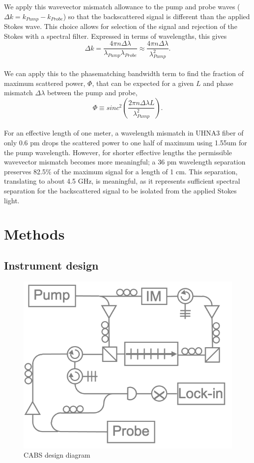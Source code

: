\documentclass[%
  reprint,
  superscriptaddress,
  amsmath,amssymb,
  aps,
  prapplied,
]{revtex4-2}
\begin{document}
We apply this wavevector mismatch allowance to the pump and probe waves ($\Delta k = k_{Pump} - k_{Probe}$) so that the backscattered signal is different than the applied Stokes wave. This choice allows for selection of the signal and rejection of the Stokes with a spectral filter. Expressed in terms of wavelengths, this gives
\\
\begin{equation}
  \Delta k = \frac{4\pi n\Delta\lambda}{\lambda_{Pump}\lambda_{Probe}} \approx \frac{4\pi n\Delta\lambda}{\lambda_{Pump}^{2}}.
\end{equation}
\\
We can apply this to the phasematching bandwidth term to find the fraction of maximum scattered power, $\Phi$, that can be expected for a given $L$ and phase mismatch $\Delta\lambda$ between the pump and probe,
\\
\begin{equation}
  \Phi \equiv sinc^{2}\left(\frac{2\pi n\Delta\lambda L}{\lambda_{Pump}^{2}}\right).
\end{equation}
\\

For an effective length of one meter, a wavelength mismatch in UHNA3 fiber of only 0.6 pm drops the scattered power to one half of maximum using 1.55um for the pump wavelength. However, for shorter effective lengths the permissible wavevector mismatch becomes more meaningful; a 36 pm wavelength separation preserves 82.5\% of the maximum signal for a length of 1 cm. This separation, translating to about 4.5 GHz, is meaningful, as it represents sufficient spectral separation for the backscattered signal to be isolated from the applied Stokes light.




\section{Methods}\label{Methods}
\subsection*{Instrument design}\label{Methods:Instrument Design}

\begin{figure}[t]
\centering
\includegraphics[width=.45\textwidth]{CABS.png}
\caption{CABS design diagram}\label{fig:CABS}
\end{figure}
\end{document}
